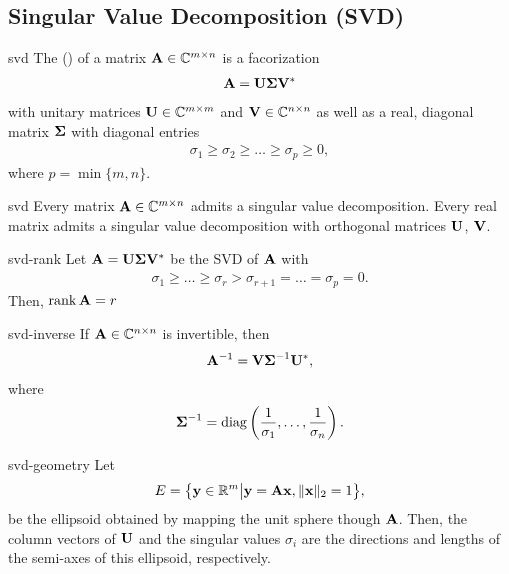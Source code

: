\subsection{Singular Value Decomposition (SVD)}

\begin{Definition}{svd}
  The  () of a matrix $\mathbf A\in\mathbb C^{m\times n}$ is a facorization
  \begin{gather}
    \mathbf A = \mathbf U\boldsymbol\Sigma\mathbf V^*
  \end{gather}
  with unitary matrices $\mathbf U\in\mathbb C^{m\times m}$ and $\mathbf V\in\mathbb C^{n\times n}$ as
  well as a real, diagonal matrix $\boldsymbol\Sigma$ with diagonal entries
  \begin{gather}
    \sigma_1 \ge \sigma_2 \ge \dots \ge \sigma_p \ge 0,
  \end{gather}
  where $p = \min\{m,n\}$.
\end{Definition}

\begin{Theorem}{svd}
  Every matrix $\mathbf A\in\mathbb C^{m\times n}$ admits a singular value
  decomposition. Every real matrix admits a singular value
  decomposition with orthogonal matrices $\mathbf U$, $\mathbf V$.
\end{Theorem}

\begin{Corollary}{svd-rank}
  Let $\mathbf A = \mathbf U\boldsymbol\Sigma\mathbf V^*$ be the SVD of $\mathbf A$ with
  \begin{gather}
    \sigma_1 \ge \dots \ge \sigma_r > \sigma_{r+1} = \dots = \sigma_p = 0.
  \end{gather}
  Then, $\operatorname{rank} \mathbf A = r$
\end{Corollary}

\begin{Corollary}{svd-inverse}
  If $\mathbf A\in\mathbb C^{n\times n}$ is invertible, then
  \begin{gather}
    \mathbf A^{-1} = \mathbf V\boldsymbol\Sigma^{-1}\mathbf U^*,
  \end{gather}
  where
  \begin{gather}
    \boldsymbol\Sigma^{-1} = \operatorname{diag}\left(\frac1{\sigma_1},\dots,\frac1{\sigma_n}\right).
  \end{gather}
\end{Corollary}

\begin{Remark}{svd-geometry}
  Let
  \begin{gather}
    E = \bigl\{ \mathbf y\in \mathbb R^m \big| \mathbf y=\mathbf A\mathbf x, \lVert\mathbf x\rVert_2 = 1 \bigr\},
  \end{gather}
  be the ellipsoid obtained by mapping the unit sphere though
  $\mathbf A$. Then, the column vectors of $\mathbf U$ and the singular values
  $\sigma_i$ are the directions and lengths of the semi-axes of this
  ellipsoid, respectively.
\end{Remark}

